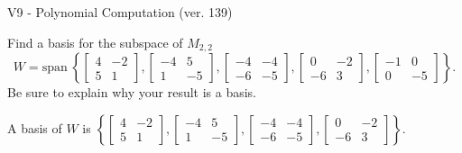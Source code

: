\begin{exercise}
  \begin{exerciseTitle}V9 - Polynomial Computation (ver. 139)\end{exerciseTitle}
  \begin{exerciseStatement}
    Find a basis for the subspace of \(M_{2,2}\) 
\[W=\mathrm{span}\ \left\{\left[\begin{array}{cc}
4 & -2 \\
5 & 1
\end{array}\right] , \left[\begin{array}{cc}
-4 & 5 \\
1 & -5
\end{array}\right] , \left[\begin{array}{cc}
-4 & -4 \\
-6 & -5
\end{array}\right] , \left[\begin{array}{cc}
0 & -2 \\
-6 & 3
\end{array}\right] , \left[\begin{array}{cc}
-1 & 0 \\
0 & -5
\end{array}\right]\right\}.\]
 Be sure to explain why your result is a basis.


  \end{exerciseStatement}
  \begin{exerciseAnswer}
   A basis of \(W\) is  \(\left\{\left[\begin{array}{cc}
4 & -2 \\
5 & 1
\end{array}\right] , \left[\begin{array}{cc}
-4 & 5 \\
1 & -5
\end{array}\right] , \left[\begin{array}{cc}
-4 & -4 \\
-6 & -5
\end{array}\right] , \left[\begin{array}{cc}
0 & -2 \\
-6 & 3
\end{array}\right]\right\}\).
  


  \end{exerciseAnswer}
\end{exercise}